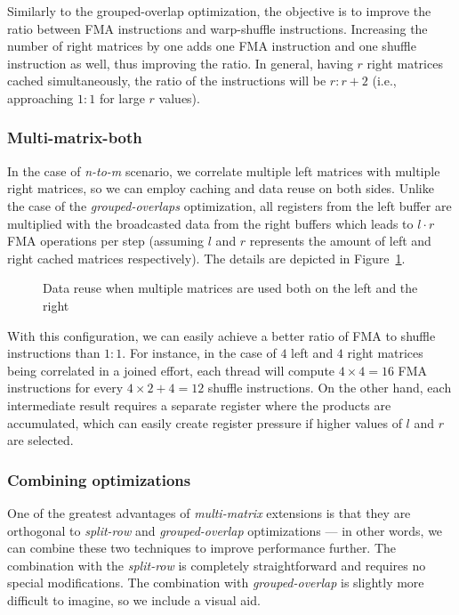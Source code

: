 Similarly to the grouped-overlap optimization, the objective is to improve the ratio between FMA instructions and warp-shuffle instructions. Increasing the number of right matrices by one adds one FMA instruction and one shuffle instruction as well, thus improving the ratio. In general, having $r$ right matrices cached simultaneously, the ratio of the instructions will be $r:r+2$ (i.e., approaching $1:1$ for large $r$ values).


\subsubsection{Multi-matrix-both}

In the case of \textit{n-to-m} scenario, we correlate multiple left matrices with multiple right matrices, so we can employ caching and data reuse on both sides. Unlike the case of the \emph{grouped-overlaps} optimization, all registers from the left buffer are multiplied with the broadcasted data from the right buffers which leads to $l\cdot r$ FMA operations per step (assuming $l$ and $r$ represents the amount of left and right cached matrices respectively). The details are depicted in Figure~\ref{fig:warpshuffle-multi-both}.

\begin{figure}[ht]
	\centering
	\def\svgwidth{0.8\textwidth}
	\fontsize{9}{12}\selectfont
	
	\caption{Data reuse when multiple matrices are used both on the left and the right}
	\label{fig:warpshuffle-multi-both}
\end{figure}

With this configuration, we can easily achieve a better ratio of FMA to shuffle instructions than $1:1$. For instance, in the case of $4$ left and $4$ right matrices being correlated in a joined effort, each thread will compute $4\times4=16$ FMA instructions for every $4\times 2 + 4 = 12$ shuffle instructions. On the other hand, each intermediate result requires a separate register where the products are accumulated, which can easily create register pressure if higher values of $l$ and $r$ are selected.


\subsubsection{Combining optimizations}

One of the greatest advantages of \emph{multi-matrix} extensions is that they are orthogonal to \emph{split-row} and \emph{grouped-overlap} optimizations --- in other words, we can combine these two techniques to improve performance further. The combination with the \emph{split-row} is completely straightforward and requires no special modifications. The combination with \emph{grouped-overlap} is slightly more difficult to imagine, so we include a visual aid.


